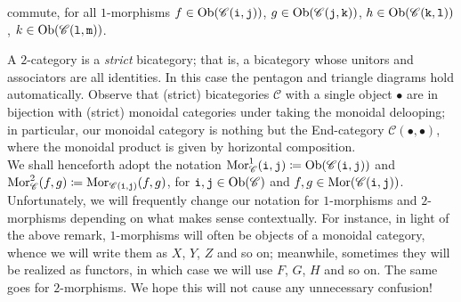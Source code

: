 \begin{definition}
\begin{center}
\end{center}
\noindent commute, for all $1$-morphisms $f \in \textnormal{Ob}(\mathscr{C}(\textnormal{\texttt{i}}, \textnormal{\texttt{j}}))$, $g \in \textnormal{Ob}(\mathscr{C}(\textnormal{\texttt{j}}, \textnormal{\texttt{k}}))$, $h \in \textnormal{Ob}(\mathscr{C}(\textnormal{\texttt{k}}, \textnormal{\texttt{l}}))$, $k \in \textnormal{Ob}(\mathscr{C}(\textnormal{\texttt{l}}, \textnormal{\texttt{m}}))$.
\end{definition}
\newpage

\noindent A $2$-category is a {\em strict} bicategory; that is, a bicategory whose unitors and associators are all identities. In this case the pentagon and triangle diagrams hold automatically. Observe that (strict) bicategories $\mathscr{C}$ with a single object $\bullet$ are in bijection with (strict) monoidal categories under taking the monoidal delooping; in particular, our monoidal category is nothing but the End-category $\mathscr{C}(\bullet, \bullet)$, where the monoidal product is given by horizontal composition.\\

\noindent We shall henceforth adopt the notation $\textnormal{Mor}_\mathscr{C}^1(\textnormal{\texttt{i}}, \textnormal{\texttt{j}}) \coloneqq \textnormal{Ob}(\mathscr{C}(\textnormal{\texttt{i}}, \textnormal{\texttt{j}}))$ and $\textnormal{Mor}_\mathscr{C}^2(f, g) \coloneqq \textnormal{Mor}_{\mathscr{C}(\textnormal{\texttt{i}}, \textnormal{\texttt{j}})}(f, g)$, for $\textnormal{\texttt{i}}, \textnormal{\texttt{j}} \in \textnormal{Ob}(\mathscr{C})$ and $f, g \in \textnormal{Mor}(\mathscr{C}(\textnormal{\texttt{i}}, \textnormal{\texttt{j}}))$. Unfortunately, we will frequently change our notation for $1$-morphisms and $2$-morphisms depending on what makes sense contextually. For instance, in light of the above remark, $1$-morphisms will often be objects of a monoidal category, whence we will write them as $X$, $Y$, $Z$ and so on; meanwhile, sometimes they will be realized as functors, in which case we will use $F$, $G$, $H$ and so on. The same goes for $2$-morphisms. We hope this will not cause any unnecessary confusion!\\

